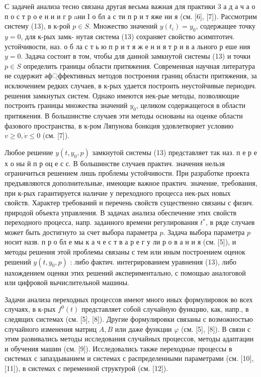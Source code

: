 \documentclass[10pt]{article}
\begin{document}
С задачей анализа тесно связана другая весьма важная для практики 3 а д а ч а о п о с т р о е н и и г р aни I $о$ бл а с ти п р и т яже ни я (см. [6], [7]). Рассмотрим систему (13), в к-рой $p \in S$. Множество значений $y\left(t_{i}\right)=y_{0}$, содержащее точку $y=0$, для к-рых замк- нутая система (13) сохраняет свойство асимптотич. устойчивости, наз. о б ла с т ь ю п р и т я ж е н и я т р и в а льного р еше ния $y=0$. Задача состоит в том, чтобы для данной замкнутой системы (13) и точки $p \in S$ определить границы области притяжения. Современная научная литература не содержит әф্ффективных методов построения границ области притяжения, за исключением редких случаев, в к-рых удается построить неустойчивые периодич. решения замкнутых систем. Однако имеются нек-рые методы, позволяющие построить границы множества значений $y_{0}$, целиком содержащегося в области притяжения. В большинстве случаев эти методы основаны на оценке области фазового пространства, в к-ром Ляпунова бонкция удовлетворяет условию $v \geqslant 0, \dot{v} \leqslant 0$ (см. [7]).



Любое решение $y\left(t, y_{0}, p\right)$ замкнутой системы (13) представляет так наз. п е р е х о ны й п р оц е с с. В большинстве случаев практич. значения нельзя ограничиться решением лишь проблемы устойчивости. При разработке проекта предъявляются дополнительные, имеющие важное практич. значение, требования, при к-рых гарантируется наличие у переходного процесса нек-рых новых свойств. Характер требований и перечень свойств существенно связаны с физич. природой объекта управления. В задачах анализа обеспечение этих свойств переходного процесса, напр. заданного времени регулирования $t^{*}$, в ряде случаев может быть достигнуто за счет выбора параметра $p$. Задача выбора параметра $p$ носит назв. п р о бл е мы к а ч е с т в а р е г у ли р о в а н и я (см. [5]), и методы решения этой проблемы связаны с тем или иным построением оценок решений $y\left(t, y_{0}, p\right)$ : либо фактич. интегрированием уравнения (13), либо нахождением оценки этих решений әкспериментально, с помощью аналоговой или цифровой вычислительной машины.



Задачи анализа переходных процессов имеют много иных формулировок во всех случаях, в к-рых $f^{0}(t)$ представляет собой случайную функцию, как, напр., в следящих системах (см. [5], [8]). Другие формулировки связаны с возможностью случайного изменения матриц $A, B$ или даже функции $\varphi$ (см. [5], [8]). В связи с этим развивались методы исследования случайных процессов, методы адаптации и обучения машин (см. [9]). Исследовались также переходные процессы в системах с запаздыванием и системах с распределенными параметрами (см. [10], [11]), в системах с переменной структурой (см. [12]).
\end{document}
